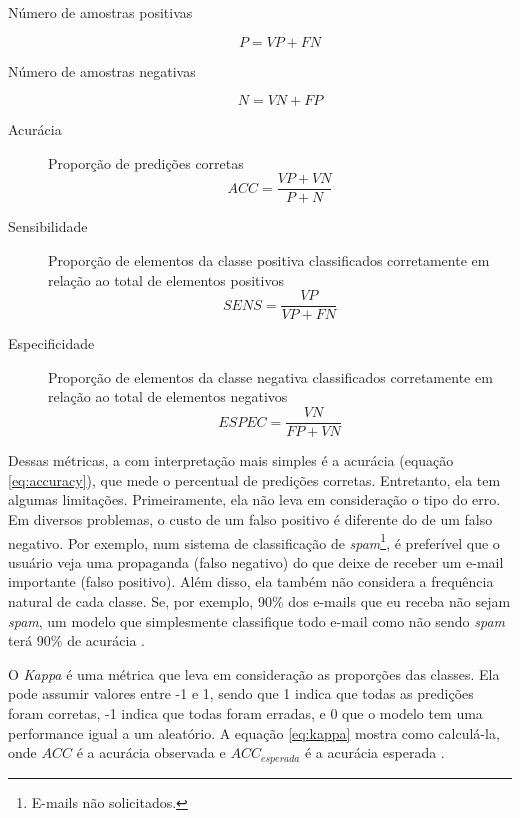 \documentclass[a4paper,titlepage]{ppgi}\usepackage[]{graphicx}\usepackage[]{color}
\begin{document}
\begin{description}
\item[Número de amostras positivas]
\begin{equation}
\label{eq:positive-rate}
P = VP + FN
\end{equation}
\item[Número de amostras negativas]
\begin{equation}
\label{eq:negative-rate}
N = VN + FP
\end{equation}
\item[Acurácia] Proporção de predições corretas
\begin{equation}
\label{eq:accuracy}
ACC = \frac{VP + VN}{P + N}
\end{equation}
\item[Sensibilidade] Proporção de elementos da classe positiva classificados
corretamente em relação ao total de elementos positivos
\begin{equation}
\label{eq:sensitivity}
SENS = \frac{VP}{VP + FN}
\end{equation}
\item[Especificidade] Proporção de elementos da classe negativa classificados
corretamente em relação ao total de elementos negativos
\begin{equation}
\label{eq:specificity}
ESPEC = \frac{VN}{FP + VN}
\end{equation}
\end{description}

Dessas métricas, a com interpretação mais simples é a acurácia (equação
\ref{eq:accuracy}), que mede o percentual de predições corretas. Entretanto,
ela tem algumas limitações. Primeiramente, ela não leva em consideração o tipo
do erro. Em diversos problemas, o custo de um falso positivo é diferente do de
um falso negativo. Por exemplo, num sistema de classificação de
\emph{spam}\footnote{E-mails não solicitados.}, é preferível que o usuário veja
uma propaganda (falso negativo) do que deixe de receber um e-mail importante
(falso positivo). Além disso, ela também não considera a frequência natural de
cada classe. Se, por exemplo, 90\% dos e-mails que eu receba não sejam
\emph{spam}, um modelo que simplesmente classifique todo e-mail como não sendo
\emph{spam} terá 90\% de acurácia \cite{Kuhn2013}.

O \emph{Kappa} é uma métrica que leva em consideração as proporções das
classes. Ela pode assumir valores entre -1 e 1, sendo que 1 indica que todas as
predições foram corretas, -1 indica que todas foram erradas, e 0 que o modelo
tem uma performance igual a um aleatório. A equação \ref{eq:kappa} mostra como
calculá-la, onde $ACC$ é a acurácia observada e $ACC_{esperada}$ é a acurácia
esperada \cite{Cohen1960}.
\end{document}
